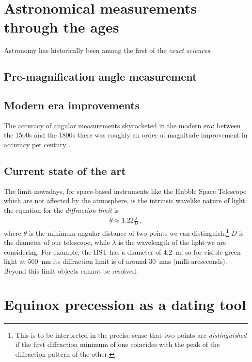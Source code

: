 \documentclass[main.tex]{subfiles}
\begin{document}
\section{Astronomical measurements through the ages}

Astronomy has historically been among the first of the \emph{exact sciences}, 

\subsection{Pre-magnification angle measurement}

\subsection{Modern era improvements}

The accuracy of angular measurements skyrocketed in the modern era: between the 1500s and the 1800s there was roughly an order of magnitude improvement in accuracy per century \cite[]{chapmanAccuracyAngularMeasuring1983}.


\subsection{Current state of the art}

The limit nowadays, for space-based instruments like the Hubble Space Telescope which are not affected by the atmosphere, is the intrinsic wavelike nature of light: the equation for the \emph{diffraction limit} is 
%
\begin{align}
\theta \approx \num{1.22} \frac{\lambda }{D}
\,,
\end{align}
%
where \(\theta \) is the minimum angular distance of two points we can distinguish,\footnote{This is to be interpreted in the precise sense that two points are \emph{distinguished} if the first diffraction minimum of one coincides with the peak of the diffraction pattern of the other.} \(D\) is the diameter of our telescope, while \(\lambda \) is the wavelength of the light we are considering.
For example, the HST has a diameter of \SI{4.2}{m}, so for visible green light at \SI{500}{nm} its diffraction limit is of around \SI{30}{mas} (milli-arcseconds).
Beyond this limit objects cannot be resolved. 

\section{Equinox precession as a dating tool}
\end{document}
